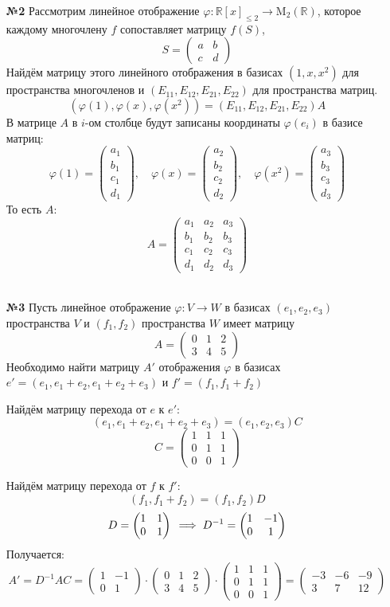 \documentclass[a4paper]{article}
\newcommand{\mat}[1]{\begin{pmatrix} #1 \end{pmatrix}}
\renewcommand{\phi}{\varphi}
\begin{document}
\begin{enumerate}
    \item[\textbf{№2}]Рассмотрим линейное отображение $\varphi: \mathbb{R}[x]_{\leqslant 2} \rightarrow \mathrm{M}_{2}(\mathbb{R})$, которое каждому многочлену $f$ сопоставляет матрицу $f(S)$, $$S = \begin{pmatrix} a & b \\ c & d \end{pmatrix}$$ Найдём матрицу этого линейного отображения в базисах $(1, x, x^2)$ для пространства многочленов и $(E_{11}, E_{12}, E_{21}, E_{22})$ для пространства матриц.
    $$(\phi(1), \phi(x), \phi(x^2)) = (E_{11}, E_{12}, E_{21}, E_{22})A$$
    В матрице $A$ в $i$-ом столбце будут записаны координаты $\phi(e_i)$ в базисе матриц:
    $$\phi(1) = \mat{a_1 \\ b_1 \\ c_1 \\ d_1}, \quad \phi(x) = \mat{a_2 \\ b_2 \\ c_2 \\ d_2}, \quad \phi(x^2) = \mat{a_3 \\ b_3 \\ c_3 \\ d_3}$$
    То есть $A$:
    $$A = \mat{a_1 & a_2 &a_3 \\ b_1 & b_2 &b_3 \\ c_1 &c_2&c_3 \\ d_1 & d_2 & d_3 }$$\\

    \item[\textbf{№3}]Пусть линейное отображение $\varphi: V \rightarrow W$ в базисах $(e_{1}, e_{2}, e_{3})$ пространства $V$ и $(f_{1}, f_{2})$ пространства $W$ имеет матрицу 
    $$
    A = \begin{pmatrix}
    0 & 1 & 2 \\
    3 & 4 & 5
    \end{pmatrix}
    $$
    Необходимо найти матрицу $A'$ отображения $\varphi$ в базисах $e' = (e_{1}, e_{1}+e_{2}, e_{1}+e_{2}+e_{3})$ и $f' = (f_{1}, f_{1}+f_{2})$

    Найдём матрицу перехода от $e$ к $e'$:
    $$(e_1, e_1+e_2, e_1+e_2+e_3) = (e_1, e_2, e_3)C$$
    $$C = \mat{1 & 1 & 1\\0 & 1 & 1 \\0 & 0 & 1}$$

    Найдём матрицу перехода от $f$ к $f'$:
    $$(f_1, f_1+f_2) = (f_1, f_2)D$$
    $$D = \mat{1 & 1\\0 & 1} \\\implies D^{-1} = \mat{1 & -1\\0 & 1}$$
    Получается:
    $$A' = D^{-1}AC = \mat{1 & -1\\0 & 1}\cdot \begin{pmatrix}
        0 & 1 & 2 \\
        3 & 4 & 5
        \end{pmatrix} \cdot \mat{1 & 1 & 1\\0 & 1 & 1 \\0 & 0 & 1} = \mat{-3 & -6 & -9 \\
        3 & 7 & 12}$$


\end{enumerate}
\end{document}
